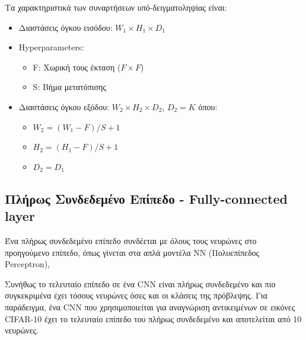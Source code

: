 Τα χαρακτηριστικά των συναρτήσεων υπό-δειγματοληψίας είναι:
\begin{itemize}
  \item{Διαστάσεις όγκου εισόδου: $W_{1} \times H_{1} \times D_{1}$}
  \item{Hyperparameters:}
    \begin{itemize}
      \item{F: Χωρική τους έκταση ($F \times F$)}
      \item{S: Βήμα μετατόπισης}
    \end{itemize}
  \item{Διαστάσεις όγκου εξόδου: $W_{2} \times H_{2} \times D_{2}$, $D_{2} = K$} όπου:
    \begin{itemize}
      \item{$W_{2} = (W_{1} - F)/S + 1$}
      \item{$H_{2} = (H_{1} - F)/S + 1$}
      \item{$D_{2} = D_{1}$}
    \end{itemize}
\end{itemize}


\subsection{Πλήρως Συνδεδεμένο Επίπεδο - Fully-connected layer}

Ένα πλήρως συνδεδεμένο επίπεδο συνδέεται με όλους τους νευρώνες στο
προηγούμενο επίπεδο, όπως γίνεται στα απλά μοντέλα NN (Πολυεπίπεδος Perceptron),

Συνήθως το τελευταίο επίπεδο σε ένα CNN είναι πλήρως συνδεδεμένο και πιο
συγκεκριμένα έχει τόσους νευρώνες όσες και οι κλάσεις της πρόβλεψης. Για
παράδειγμα, ένα CNN που χρησιμοποιείται για αναγνώριση αντικειμένων σε
εικόνες CIFAR-10 έχει το τελευταίο επίπεδο του πλήρως συνδεδεμένο και
αποτελείται από 10 νευρώνες.
